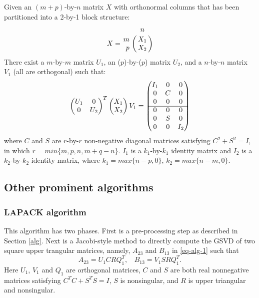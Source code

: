    Given an $(m+p)$-by-$n$ matrix $X$ with orthonormal columns that has been partitioned into a 2-by-1 block structure: 
        \begin{displaymath}
            X = \bordermatrix{ & n  \cr
            \hfill m & X_1 \cr
            \hfill p & X_2}
        \end{displaymath}
    There exist a $m$-by-$m$ matrix $U_1$, an ($p$)-by-($p$) matrix $U_2$, and a $n$-by-$n$ matrix $V_1$ (all are orthogonal) such that:
        \begin{displaymath}
            \begin{pmatrix}
                U_1 & 0 \\
                0 & U_2
            \end{pmatrix}^{T}
            \begin{pmatrix}
                X_1 \\
                X_2
            \end{pmatrix}V_1 = 
            \begin{pmatrix}
                I_1 & 0 & 0 \\
                0 & C & 0 \\
                0 & 0 & 0 \\
                \cline{1-3} 
                0 & 0 & 0 \\
                0 & S & 0 \\
                0 & 0 & I_2
            \end{pmatrix}
        \end{displaymath}
    where $C$ and $S$ are $r$-by-$r$ non-negative diagonal matrices satisfying $C^2 + S^2 = I$, in which $r = min\{m,p,n,m+q-n\}$. $I_1$ is a $k_1$-by-$k_1$ identity matrix and $I_2$ is a $k_2$-by-$k_2$ identity matrix, where $k_1 = max\{n-p,0\}$, $k_2 = max\{n-m,0\}$.
    
    \subsection{Other prominent algorithms}  
    \subsubsection{LAPACK algorithm}\label{LAPACKalg}
    This algorithm \cite[pp.~51--53]{anderson1999lapack} has two phases.  First is a pre-processing step as described in Section \ref{alg}. Next is a Jacobi-style method \cite{paige1986computing} \cite{bai1993computing} to directly compute the GSVD of two square upper trangular matrices, namely, $A_{23}$ and $B_{13}$ in \eqref{eq-alg-1} such that
    \begin{equation} \label{eq-alg-jacobi}
        A_{23} = U_1CRQ_1^{T},\ \ \ \ B_{13} = V_1SRQ_1^{T}.
    \end{equation}
    Here $U_1$, $V_1$ and $Q_1$ are orthogonal matrices, $C$ and $S$ are both real nonnegative matrices satisfying $C^TC + S^TS = I$, $S$ is nonsingular, and $R$ is upper triangular and nonsingular.
    
